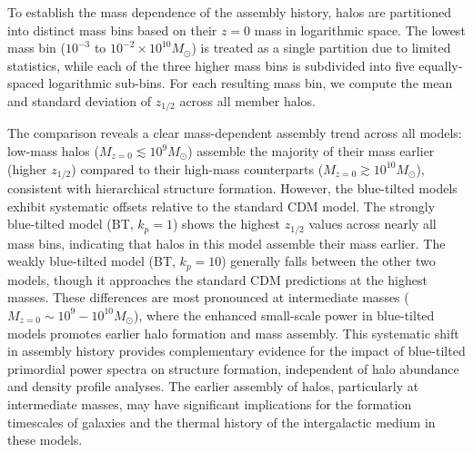 \documentclass[
 reprint,
 superscriptaddress,
 nofootinbib,
 nobibnotes,
 amsmath,
 amssymb,
 aps,
 prd,
 floatfix,
 longbibliography
]{revtex4-1}
\begin{document}
To establish the mass dependence of the assembly history, halos are partitioned into distinct mass bins based on their $z=0$ mass in logarithmic space. The lowest mass bin ($10^{-3}$ to $10^{-2} \times 10^{10} M_{\odot}$) is treated as a single partition due to limited statistics, while each of the three higher mass bins is subdivided into five equally-spaced logarithmic sub-bins. For each resulting mass bin, we compute the mean and standard deviation of $z_{1/2}$ across all member halos.

The comparison reveals a clear mass-dependent assembly trend across all models: low-mass halos ($M_{z=0} \lesssim 10^{9} M_{\odot}$) assemble the majority of their mass earlier (higher $z_{1/2}$) compared to their high-mass counterparts ($M_{z=0} \gtrsim 10^{10} M_{\odot}$), consistent with hierarchical structure formation. However, the blue-tilted models exhibit systematic offsets relative to the standard CDM model. The strongly blue-tilted model (BT, $k_p=1$) shows the highest $z_{1/2}$ values across nearly all mass bins, indicating that halos in this model assemble their mass earlier. The weakly blue-tilted model (BT, $k_p=10$) generally falls between the other two models, though it approaches the standard CDM predictions at the highest masses. These differences are most pronounced at intermediate masses ($M_{z=0} \sim 10^{9} - 10^{10} M_{\odot}$), where the enhanced small-scale power in blue-tilted models promotes earlier halo formation and mass assembly.
This systematic shift in assembly history provides complementary evidence for the impact of blue-tilted primordial power spectra on structure formation, independent of halo abundance and density profile analyses. The earlier assembly of halos, particularly at intermediate masses, may have significant implications for the formation timescales of galaxies and the thermal history of the intergalactic medium in these models.
\end{document}
